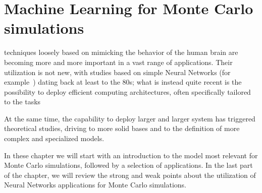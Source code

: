 \chapter{Machine Learning for Monte Carlo simulations}
 techniques loosely based on mimicking the behavior of the human brain are becoming more and more important in a vast range of applications.
Their utilization is not new, with studies based on simple Neural Networks (for example~\cite{nn1,nn2,nn3}) dating back at least to the 80s; what is instead quite recent is the possibility to deploy efficient computing architectures, often specifically tailored to the tasks

At the same time, the capability to deploy larger and larger system has triggered theoretical studies, driving to more solid bases and to  the definition of more complex and specialized models.

In these chapter we will start with an introduction to the model most relevant for Monte Carlo simulations, followed by a selection of applications. In the last part of the chapter, we will review the strong and weak points about the utilization of Neural Networks applications for Monte Carlo simulations.
